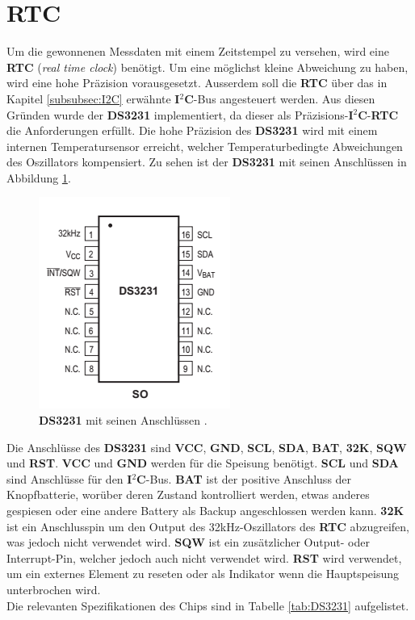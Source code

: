 \section{RTC}
\label{chap:RTC}
Um die gewonnenen Messdaten mit einem Zeitstempel zu versehen, wird eine \textbf{RTC} (\textit{real time clock}) benötigt. Um eine möglichst kleine Abweichung zu haben, wird eine hohe Präzision vorausgesetzt. Ausserdem soll die \textbf{RTC} über das in Kapitel \ref{subsubsec:I2C} erwähnte \textbf{I$^2$C}-Bus angesteuert werden. Aus diesen Gründen wurde der \textbf{DS3231} implementiert, da dieser als Präzisions-\textbf{I$^2$C}-\textbf{RTC} die Anforderungen erfüllt. Die hohe Präzision des \textbf{DS3231} wird mit einem internen Temperatursensor erreicht, welcher Temperaturbedingte Abweichungen des Oszillators kompensiert. Zu sehen ist der \textbf{DS3231} mit seinen Anschlüssen in Abbildung \ref{fig:DS3231}.

\begin{figure}[h]
\centering
\includegraphics[width=0.4\linewidth]{graphics/DS3231.png}
\caption{\textbf{DS3231} mit seinen Anschlüssen \cite{DS3231DS}.}
\label{fig:DS3231}
\end{figure}

Die Anschlüsse des \textbf{DS3231} sind \textbf{VCC}, \textbf{GND}, \textbf{SCL}, \textbf{SDA}, \textbf{BAT}, \textbf{32K}, \textbf{SQW} und \textbf{RST}. \textbf{VCC} und \textbf{GND} werden für die Speisung benötigt. \textbf{SCL} und \textbf{SDA} sind Anschlüsse für den \textbf{I$^2$C}-Bus. \textbf{BAT} ist der positive Anschluss der Knopfbatterie, worüber deren Zustand kontrolliert werden, etwas anderes gespiesen oder eine andere Battery als Backup angeschlossen werden kann. \textbf{32K} ist ein Anschlusspin um den Output des 32kHz-Oszillators des \textbf{RTC} abzugreifen, was jedoch nicht verwendet wird. \textbf{SQW} ist ein zusätzlicher Output- oder Interrupt-Pin, welcher jedoch auch nicht verwendet wird. \textbf{RST} wird verwendet, um ein externes Element zu reseten oder als Indikator wenn die Hauptspeisung unterbrochen wird. \cite{DS3231DS}\\
Die relevanten Spezifikationen des Chips sind in Tabelle \ref{tab:DS3231} aufgelistet.\\

